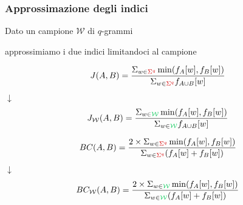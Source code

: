 \begin{frame}
\frametitle{Approssimazione degli indici}
\centering

Dato un campione $\mathcal{W}$ di $q$-grammi 

approssimiamo i due indici limitandoci al campione

\pause

\begin{equation*}\label{jaccard-sub}	
J(A,B) = \frac{ \Sigma_{w \in \color{red}\Sigma^{q}\color{black}} \min(f_{A}[w], f_{B}[w]) }{ \Sigma_{w \in \color{red}\Sigma^{q}\color{black}} f_{A \cup B}[w] }
\end{equation*}
$\downarrow$
\begin{equation*}\label{jaccard-sub}	
J_{\mathcal{W}}(A,B) = \frac{ \Sigma_{w \in \color{green}\mathcal{W}\color{black}} \min(f_{A}[w], f_{B}[w]) }{ \Sigma_{w \in \color{green}\mathcal{W}\color{black}} f_{A \cup B}[w] }
\end{equation*}

\pause

\begin{equation*}\label{bray-sub}
BC(A,B) = \frac{ 2 \times \Sigma_{w \in \color{red}\Sigma^{q}\color{black}} \min(f_{A}[w], f_{B}[w]) }{ \Sigma_{w \in \color{red}\Sigma^{q}\color{black}} (f_{A}[w] + f_{B}[w]) }
\end{equation*}
$\downarrow$
\begin{equation*}\label{bray-sub}
BC_{\mathcal{W}}(A,B) = \frac{ 2 \times \Sigma_{w \in \color{green}\mathcal{W}\color{black}} \min(f_{A}[w], f_{B}[w]) }{ \Sigma_{w \in \color{green}\mathcal{W}\color{black}} (f_{A}[w] + f_{B}[w]) }
\end{equation*}

\end{frame}

